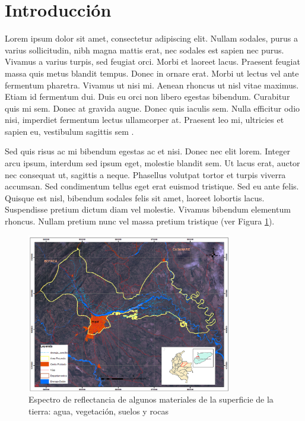 \documentclass[artMGITG,SIG,accept,moreauthors,font4]{mgitg}%
\begin{document}
%
\section{Introducción}
%
\noindent
Lorem ipsum dolor sit amet, consectetur adipiscing elit. Nullam sodales, purus a varius sollicitudin, nibh magna mattis erat, nec sodales est sapien nec purus. Vivamus a varius turpis, sed feugiat orci. Morbi et laoreet lacus. Praesent feugiat massa quis metus blandit tempus. Donec in ornare erat. Morbi ut lectus vel ante fermentum pharetra. Vivamus ut nisi mi. Aenean rhoncus ut nisl vitae maximus. Etiam id fermentum dui. Duis eu orci non libero egestas bibendum. Curabitur quis mi sem. Donec at gravida augue. Donec quis iaculis sem. Nulla efficitur odio nisi, imperdiet fermentum lectus ullamcorper at. Praesent leo mi, ultricies et sapien eu, vestibulum sagittis sem \cite{Ref01,Ref12,Ref13}.

Sed quis risus ac mi bibendum egestas ac et nisi. Donec nec elit lorem. Integer arcu ipsum, interdum sed ipsum eget, molestie blandit sem. Ut lacus erat, auctor nec consequat ut, sagittis a neque. Phasellus volutpat tortor et turpis viverra accumsan. Sed condimentum tellus eget erat euismod tristique. Sed eu ante felis. Quisque est nisl, bibendum sodales felis sit amet, laoreet lobortis lacus. Suspendisse pretium dictum diam vel molestie. Vivamus bibendum elementum rhoncus. Nullam pretium nunc vel massa pretium tristique (ver Figura \ref{fig1}). 

\begin{figure}[!ht]
    \centering
    \includegraphics[width=0.8\textwidth]{figuras/figura1}
    \caption{Espectro de reflectancia de algunos materiales de la superficie de la tierra: agua, vegetación, suelos y rocas}
    \label{fig1}
\end{figure}
\end{document}
